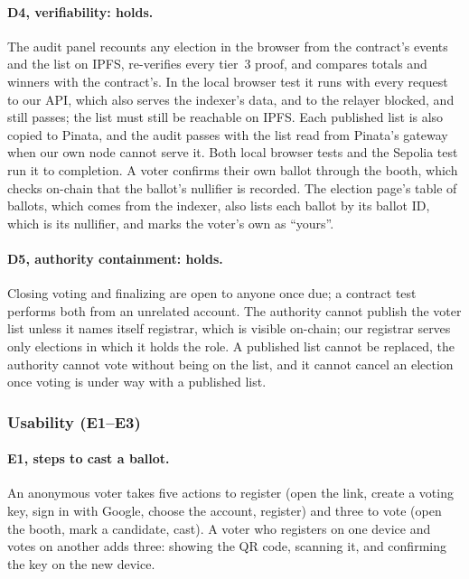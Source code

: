 \paragraph{D4, verifiability: holds.}
The audit panel recounts any election in the browser from the contract's
events and the list on IPFS, re-verifies every tier~3 proof, and compares
totals and winners with the contract's. In the local browser test it runs
with every request to our API, which also serves the indexer's data, and to
the relayer blocked, and still passes; the list must still be reachable on
IPFS. Each published list is also copied to Pinata, and the audit passes with
the list read from Pinata's gateway when our own node cannot serve it. Both local browser tests and the Sepolia test run
it to completion. A
voter confirms their own ballot through the booth, which checks on-chain that
the ballot's nullifier is recorded. The election page's table of ballots,
which comes from the indexer, also lists each ballot by its ballot ID, which is
its nullifier, and marks the voter's own as ``yours''.

\paragraph{D5, authority containment: holds.}
Closing voting and finalizing are open to anyone once due; a contract test
performs both from an unrelated account. The authority cannot publish the voter
list unless it names itself registrar, which is visible on-chain; our registrar
serves only elections in which it holds the role. A published list cannot be
replaced, the authority cannot vote without being on the list, and it cannot
cancel an election once voting is under way with a published list.

\subsubsection{Usability (E1--E3)}

\paragraph{E1, steps to cast a ballot.}
An anonymous voter takes five actions to register (open
the link, create a voting key, sign in with Google, choose the account,
register) and three to vote (open the booth, mark a candidate, cast). A voter
who registers on one device and votes on another adds three: showing the
QR code, scanning it, and confirming the key on the new device.

